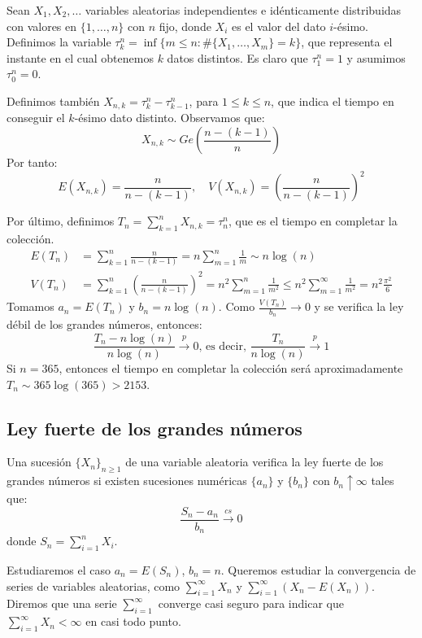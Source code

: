 \begin{example}
    Sean $X_1, X_2, \dots$ variables aleatorias independientes e idénticamente distribuidas con valores en $\{1, \dots, n\}$ con $n$ fijo, donde $X_i$ es el valor del dato $i$-ésimo.
    Definimos la variable $\tau_k^n = \inf \{m \leq n : \#\{X_1, \dots, X_m\} = k\}$, que representa el instante en el cual obtenemos $k$ datos distintos.
    Es claro que $\tau_1^n = 1$ y asumimos $\tau^n_0 = 0$.

    Definimos también $X_{n, k} = \tau^n_k - \tau^n_{k-1}$, para $1 \leq k \leq n$, que indica el tiempo en conseguir el $k$-ésimo dato distinto.
    Observamos que:
    $$X_{n, k} \sim Ge\left(\frac{n-(k-1)}{n}\right)$$
    Por tanto:
    $$E(X_{n, k}) = \frac{n}{n-(k-1)}, \quad V(X_{n, k}) = \left(\frac{n}{n-(k-1)}\right)^2$$

    Por último, definimos $T_n = \sum_{k=1}^n X_{n, k} = \tau^n_n$, que es el tiempo en completar la colección.
    \begin{align*}
        E(T_n) & = \sum_{k=1}^n \frac{n}{n-(k-1)} = n \sum_{m=1}^n \frac{1}{m} \sim n\log(n)                                                                     \\
        V(T_n) & = \sum_{k=1}^n \left(\frac{n}{n-(k-1)}\right)^2 = n^2 \sum_{m=1}^n \frac{1}{m^2} \leq n^2 \sum_{m=1}^\infty \frac{1}{m^2} = n^2 \frac{\pi^2}{6}
    \end{align*}
    Tomamos $a_n = E(T_n)$ y $b_n = n\log(n)$.
    Como $\frac{V(T_n)}{b_n} \to 0$ y se verifica la ley débil de los grandes números, entonces:
    $$\frac{T_n - n\log(n)}{n\log(n)} \xrightarrow{p} 0 \text{, es decir, } \frac{T_n}{n\log(n)} \xrightarrow{p} 1$$
    Si $n = 365$, entonces el tiempo en completar la colección será aproximadamente $T_n \sim 365\log(365) > 2153$.
\end{example}

\subsection*{Ley fuerte de los grandes números}
\begin{definition}
    Una sucesión $\{X_n\}_{n \geq 1}$ de una variable aleatoria verifica la ley fuerte de los grandes números si existen sucesiones numéricas $\{a_n\}$ y $\{b_n\}$ con $b_n \uparrow \infty$ tales que:
    $$\frac{S_n - a_n}{b_n} \xrightarrow{cs} 0$$
    donde $S_n = \sum_{i=1}^n X_i$.
\end{definition}

\begin{remark}
    Estudiaremos el caso $a_n = E(S_n)$, $b_n = n$.
    Queremos estudiar la convergencia de series de variables aleatorias, como $\sum_{i=1}^\infty X_n$ y $\sum_{i=1}^\infty (X_n - E(X_n))$.
    Diremos que una serie $\sum_{i=1}^\infty$ converge casi seguro para indicar que $\sum_{i=1}^\infty X_n < \infty$ en casi todo punto.
\end{remark}


